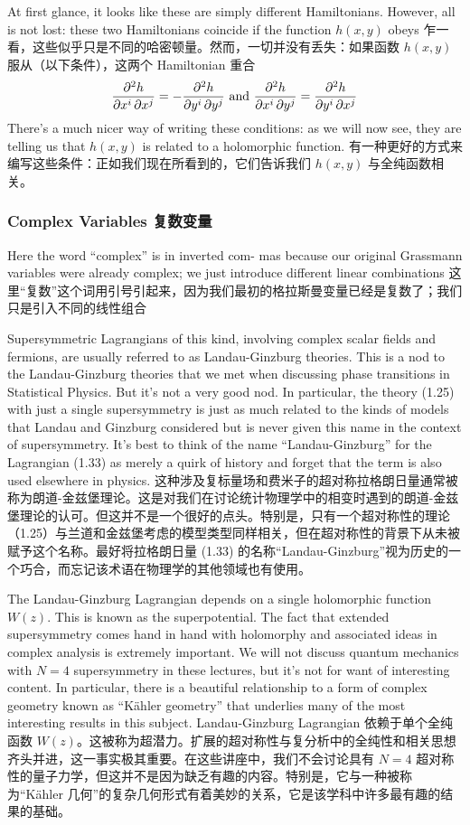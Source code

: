 \documentclass{article}
\newcommand{\SakuraiYukiko}{\emoji{cherry-blossom}\emoji{snowflake}}
\begin{document}
At ﬁrst glance, it looks like these are simply diﬀerent Hamiltonians. However, all is not lost: these two Hamiltonians coincide if the function $h(x, y)$ obeys
乍一看，这些似乎只是不同的哈密顿量。然而，一切并没有丢失：如果函数 $h(x, y)$ 服从（以下条件），这两个 Hamiltonian 重合
\[ \pdv{h}{x^i, x^j} = - \pdv{h}{y^i, y^j} \text{ and } \pdv{h}{x^i, y^j} = \pdv{h}{y^i, x^j} \]
There's a much nicer way of writing these conditions: as we will now see, they are telling us that $h(x, y)$ is related to a holomorphic function.
有一种更好的方式来编写这些条件：正如我们现在所看到的，它们告诉我们 $h(x, y)$ 与全纯函数相关。

\subsubsection*{Complex Variables \SakuraiYukiko 复数变量}

Here the word “complex” is in inverted com- mas because our original Grassmann variables were already complex; we just introduce different linear combinations
这里“复数”这个词用引号引起来，因为我们最初的格拉斯曼变量已经是复数了；我们只是引入不同的线性组合

Supersymmetric Lagrangians of this kind, involving complex scalar ﬁelds and fermions, are usually referred to as Landau-Ginzburg theories. This is a nod to the Landau-Ginzburg theories that we met when discussing phase transitions in Statistical Physics. But it's not a very good nod. In particular, the theory (1.25) with just a single supersymmetry is just as much related to the kinds of models that Landau and Ginzburg considered but is never given this name in the context of supersymmetry. It's best to think of the name “Landau-Ginzburg” for the Lagrangian (1.33) as merely a quirk of history and forget that the term is also used elsewhere in physics.
这种涉及复标量场和费米子的超对称拉格朗日量通常被称为朗道-金兹堡理论。这是对我们在讨论统计物理学中的相变时遇到的朗道-金兹堡理论的认可。但这并不是一个很好的点头。特别是，只有一个超对称性的理论（1.25）与兰道和金兹堡考虑的模型类型同样相关，但在超对称性的背景下从未被赋予这个名称。最好将拉格朗日量 (1.33) 的名称“Landau-Ginzburg”视为历史的一个巧合，而忘记该术语在物理学的其他领域也有使用。

The Landau-Ginzburg Lagrangian depends on a single holomorphic function $W (z)$. This is known as the superpotential. The fact that extended supersymmetry comes hand in hand with holomorphy and associated ideas in complex analysis is extremely important. We will not discuss quantum mechanics with $N = 4$ supersymmetry in these lectures, but it's not for want of interesting content. In particular, there is a beautiful relationship to a form of complex geometry known as “Kähler geometry” that underlies many of the most interesting results in this subject.
Landau-Ginzburg Lagrangian 依赖于单个全纯函数 $W (z)$。这被称为超潜力。扩展的超对称性与复分析中的全纯性和相关思想齐头并进，这一事实极其重要。在这些讲座中，我们不会讨论具有 $N = 4$ 超对称性的量子力学，但这并不是因为缺乏有趣的内容。特别是，它与一种被称为“Kähler 几何”的复杂几何形式有着美妙的关系，它是该学科中许多最有趣的结果的基础。
\end{document}
